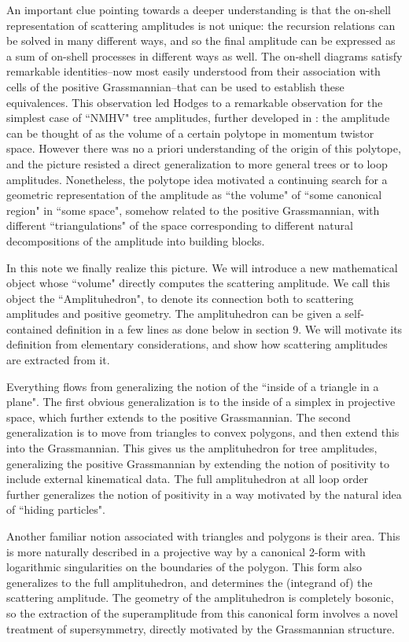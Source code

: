\documentclass[12pt,nohyper,twosided]{JHEP3}
\begin{document}
An important clue \cite{N4,A1,N6} pointing towards a deeper understanding is that
the on-shell representation of scattering
amplitudes is not unique: the recursion relations can be solved in
many different ways, and so the final amplitude can be expressed as
a sum of on-shell processes in different ways as well. The on-shell
diagrams satisfy remarkable identities--now  most easily understood
from their association with cells of the positive Grassmannian--that
can be used to establish these equivalences. This observation led
Hodges \cite{A1} to a remarkable observation for the simplest case of
``NMHV" tree amplitudes, further developed  in \cite{N7}: the amplitude
can be thought of as the volume of a certain polytope in momentum
twistor space. However there was no a priori
understanding of the origin of this polytope, and the picture
resisted a direct generalization to more general trees or to loop amplitudes.
Nonetheless, the polytope idea motivated a continuing search for a geometric representation of the amplitude
 as ``the volume" of ``some canonical region" in
``some space", somehow related to the positive Grassmannian, with
different ``triangulations" of the space corresponding to different
natural decompositions of the amplitude into building blocks.

In this note we finally realize this picture. We will introduce a
new mathematical object whose ``volume" directly computes the
scattering amplitude. We call this object the ``Amplituhedron", to
denote its connection both to scattering amplitudes and positive
geometry. The amplituhedron can be given a self-contained definition
in a few lines as done below in section 9. We will motivate its
definition from elementary considerations,  and show how scattering
amplitudes are extracted from it.

Everything flows from generalizing the notion of the ``inside of a
triangle in a plane". The first obvious generalization is
to the inside of a simplex in projective space, which further
extends to the positive Grassmannian. The second generalization
is to move from triangles to convex polygons, and then extend this
into the Grassmannian. This gives us the amplituhedron for tree
amplitudes, generalizing the positive Grassmannian by extending the
notion of positivity to include external kinematical data. The full
amplituhedron at all loop order further generalizes the notion of
positivity in a way motivated by the natural idea of ``hiding
particles".

Another familiar  notion associated with triangles and polygons is
their area. This is more naturally described in a projective way by
a canonical 2-form with logarithmic singularities on the boundaries
of the polygon. This form also generalizes to the full
amplituhedron, and determines the (integrand of) the scattering
amplitude. The geometry of the amplituhedron is completely bosonic,
so the extraction of the superamplitude from this canonical form
involves a novel treatment of supersymmetry, directly motivated by
the Grassmannian structure.
\end{document}
